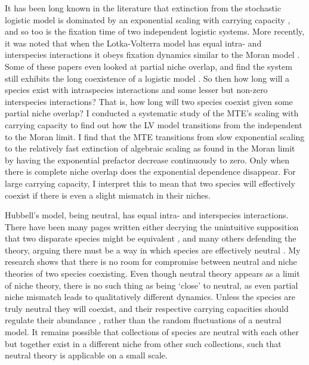 It has been long known in the literature that extinction from the stochastic logistic model is dominated by an exponential scaling with carrying capacity \cite{Norden1982,Kamenev2008,Assaf2010,Ovaskainen2010}, and so too is the fixation time of two independent logistic systems. 
More recently, it was noted that when the Lotka-Volterra model has equal intra- and interspecies interactions it obeys fixation dynamics similar to the Moran model \cite{Lin2012,Constable2015,Chotibut2015,Young2018}. 
Some of these papers even looked at partial niche overlap, and find the system still exhibits the long coexistence of a logistic model \cite{which of them?}. %
So then how long will a species exist with intraspecies interactions and some lesser but non-zero interspecies interactions? That is, how long will two species coexist given some partial niche overlap? 
I conducted a systematic study of the MTE's scaling with carrying capacity to find out how the LV model transitions from the independent to the Moran limit. 
I find that the MTE transitions from slow exponential scaling to the relatively fast extinction of algebraic scaling as found in the Moran limit by having the exponential prefactor decrease continuously to zero. 
Only when there is complete niche overlap does the exponential dependence disappear. 
For large carrying capacity, I interpret this to mean that two species will effectively coexist if there is even a slight mismatch in their niches. 

Hubbell's model, being neutral, has equal intra- and interspecies interactions. 
There have been many pages written either decrying the unintuitive supposition that two disparate species might be equivalent \cite{Ricklefs2006,Kalyuzhny2014,Carroll2015}, and many others defending the theory, arguing there must be a way in which species are effectively neutral \cite{Hubbell2006,Rosindell2011}. %
My research shows that there is no room for compromise between neutral and niche theories of two species coexisting. 
Even though neutral theory appears as a limit of niche theory, there is no such thing as being `close' to neutral, as even partial niche mismatch leads to qualitatively different dynamics. 
Unless the species are truly neutral they will coexist, and their respective carrying capacities should regulate their abundance \cite{MacArthur1957,Sugihara2003}, rather than the random fluctuations of a neutral model. 
It remains possible that collections of species are neutral with each other but together exist in a different niche from other such collections, such that neutral theory is applicable on a small scale. 

